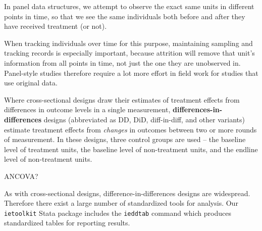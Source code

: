 In panel data structures, we attempt to observe the exact same units
in different points in time, so that we see the same individuals
both before and after they have received treatment (or not).

When tracking individuals over time for this purpose,
maintaining sampling and tracking records is especially important,
because attrition will remove that unit's information
from all points in time, not just the one they are unobserved in.
Panel-style studies therefore require a lot more effort in field work
for studies that use original data.

Where cross-sectional designs draw their estimates of treatment effects
from differences in outcome levels in a single measurement,
\textbf{differences-in-differences}
designs (abbreviated as DD, DiD, diff-in-diff, and other variants)
estimate treatment effects from \textit{changes} in outcomes
between two or more rounds of measurement.
In these designs, three control groups are used –
the baseline level of treatment units,
the baseline level of non-treatment units,
and the endline level of non-treatment units.

ANCOVA?

As with cross-sectional designs, difference-in-differences designs are widespread.
Therefore there exist a large number of standardized tools for analysis.
Our \texttt{ietoolkit} Stata package includes the \texttt{ieddtab} command
which produces standardized tables for reporting results.

